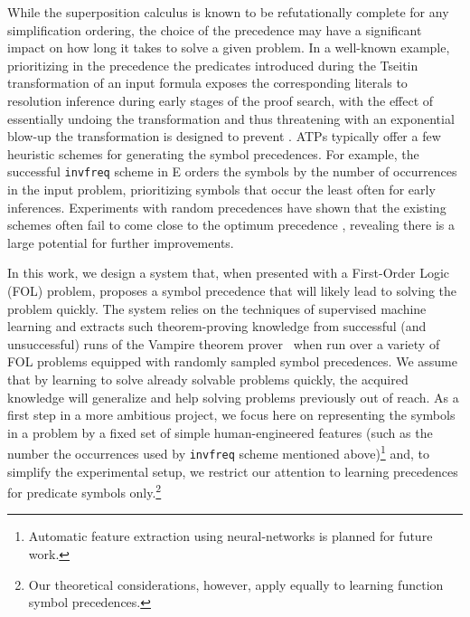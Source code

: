 While the superposition calculus is known \cite{DBLP:journals/logcom/BachmairG94} to be refutationally complete for any simplification ordering, the choice of the precedence may have a significant impact on how long it takes to solve a given problem.
In a well-known example, prioritizing in the precedence the predicates introduced during the Tseitin transformation of an input formula \cite{Tseitin1983} exposes the corresponding literals to resolution inference during early stages of the proof search,
with the effect of essentially undoing the transformation and thus threatening with an exponential blow-up
the transformation is designed to prevent \cite{Reger2016}.
%
ATPs typically offer a few heuristic schemes for generating the symbol precedences.
For example, the successful \texttt{invfreq} scheme in E \cite{E-manual} orders the symbols by the number of occurrences in the input problem,
prioritizing symbols that occur the least often for early inferences.
Experiments with random precedences have shown that the existing schemes often fail to come close to the optimum precedence \cite{RegerSuda2017}, revealing there is a large potential for further improvements.

In this work, we design a system that, when presented with a First-Order Logic (FOL) problem,
proposes a symbol precedence that will likely lead to solving the problem quickly.
The system relies on the techniques of supervised machine learning and extracts
such theorem-proving knowledge from successful (and unsuccessful) runs of 
the Vampire theorem prover~\cite{Kovacs2013} when run over a variety of FOL problems equipped
with randomly sampled symbol precedences. 
We assume that by learning to solve already solvable problems quickly,
the acquired knowledge will generalize and help solving problems previously out of reach.
As a first step in a more ambitious project,
we focus here on representing the symbols in a problem by a fixed set of simple human-engineered features
(such as the number the occurrences used by \texttt{invfreq} scheme mentioned above)\footnote{Automatic
feature extraction using neural-networks is planned for future work.}
and, to simplify the experimental setup, we restrict our attention to learning precedences for predicate symbols only.\footnote{Our theoretical considerations, however, apply equally to learning function symbol precedences.}

